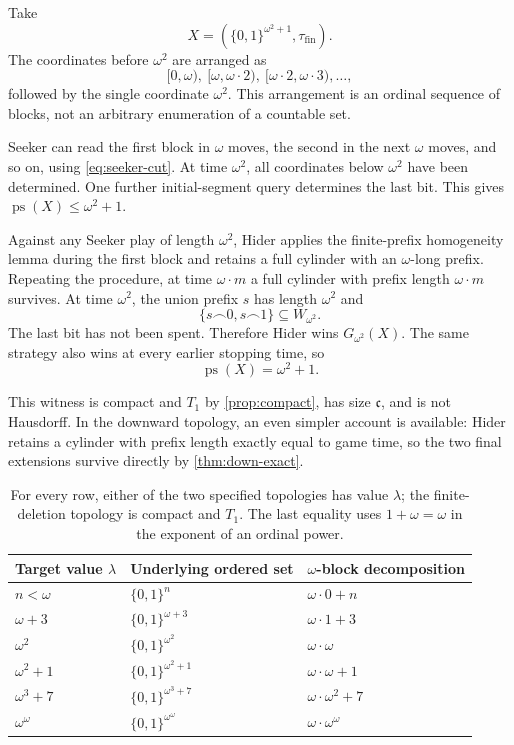 \documentclass[11pt,a4paper]{article}
\theoremstyle{definition}
\theoremstyle{remark}
\newcommand{\ps}{\operatorname{ps}}
\newcommand{\fin}{\mathrm{fin}}
\newcommand{\cat}{\mathbin{\frown}}
\newcommand{\two}{\{0,1\}}
\newcommand{\cfr}{\mathfrak c}
\newcommand{\tauF}{\tau_{\fin}}
\begin{document}
Take
\begin{equation}\label{eq:concrete}
 X=\left(\two^{\omega^2+1},\tauF\right).
\end{equation}
The coordinates before $\omega^2$ are arranged as
\[
 [0,\omega),\ [\omega,\omega\cdot2),\ [\omega\cdot2,\omega\cdot3),\ldots,
\]
followed by the single coordinate $\omega^2$. This arrangement is an ordinal
sequence of blocks, not an arbitrary enumeration of a countable set.

Seeker can read the first block in $\omega$ moves, the second in the next
$\omega$ moves, and so on, using \eqref{eq:seeker-cut}. At time $\omega^2$,
all coordinates below $\omega^2$ have been determined. One further initial-segment
query determines the last bit. This gives $\ps(X)\leq\omega^2+1$.

Against any Seeker play of length $\omega^2$, Hider applies the finite-prefix
homogeneity lemma during the first block and retains a full cylinder with an
$\omega$-long prefix. Repeating the procedure, at time $\omega\cdot m$ a full
cylinder with prefix length $\omega\cdot m$ survives. At time $\omega^2$, the
union prefix $s$ has length $\omega^2$ and
\[
                          \{s\cat0,s\cat1\}\subseteq W_{\omega^2}.
\]
The last bit has not been spent. Therefore Hider wins $G_{\omega^2}(X)$.
The same strategy also wins at every earlier stopping time, so
\[
                             \ps(X)=\omega^2+1.
\]

This witness is compact and $T_1$ by \cref{prop:compact}, has size $\cfr$, and is
not Hausdorff. In the downward topology, an even simpler account is available:
Hider retains a cylinder with prefix length exactly equal to game time, so the
two final extensions survive directly by \cref{thm:down-exact}.

\begin{table}[ht]
\centering
\begin{tabular}{@{}lll@{}}
\toprule
Target value $\lambda$ & Underlying ordered set & $\omega$-block decomposition\\
\midrule
$n<\omega$ & $\two^n$ & $\omega\cdot0+n$\\
$\omega+3$ & $\two^{\omega+3}$ & $\omega\cdot1+3$\\
$\omega^2$ & $\two^{\omega^2}$ & $\omega\cdot\omega$\\
$\omega^2+1$ & $\two^{\omega^2+1}$ & $\omega\cdot\omega+1$\\
$\omega^3+7$ & $\two^{\omega^3+7}$ & $\omega\cdot\omega^2+7$\\
$\omega^\omega$ & $\two^{\omega^\omega}$ & $\omega\cdot\omega^\omega$\\
\bottomrule
\end{tabular}
\caption{For every row, either of the two specified topologies has value
$\lambda$; the finite-deletion topology is compact and $T_1$. The last equality
uses $1+\omega=\omega$ in the exponent of an ordinal power.}
\label{tab:examples}
\end{table}
\end{document}
